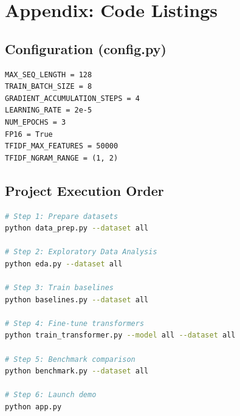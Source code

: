 \documentclass[12pt, a4paper]{article}
\begin{document}
\newpage
\appendix
\section{Appendix: Code Listings}

\subsection{Configuration (config.py)}
\begin{lstlisting}[caption={Key configuration parameters}]
MAX_SEQ_LENGTH = 128
TRAIN_BATCH_SIZE = 8
GRADIENT_ACCUMULATION_STEPS = 4
LEARNING_RATE = 2e-5
NUM_EPOCHS = 3
FP16 = True
TFIDF_MAX_FEATURES = 50000
TFIDF_NGRAM_RANGE = (1, 2)
\end{lstlisting}

\subsection{Project Execution Order}
\begin{lstlisting}[caption={Running the complete pipeline}, language=bash]
# Step 1: Prepare datasets
python data_prep.py --dataset all

# Step 2: Exploratory Data Analysis
python eda.py --dataset all

# Step 3: Train baselines
python baselines.py --dataset all

# Step 4: Fine-tune transformers
python train_transformer.py --model all --dataset all

# Step 5: Benchmark comparison
python benchmark.py --dataset all

# Step 6: Launch demo
python app.py
\end{lstlisting}
\end{document}
